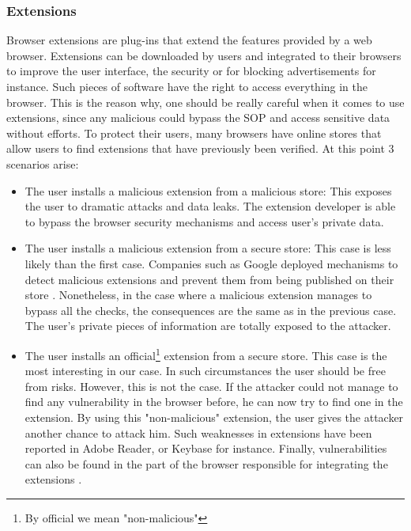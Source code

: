 \documentclass[journal]{IEEEtran}
\begin{document}
\subsubsection*{\textbf{Extensions}}
Browser extensions are plug-ins that extend the features provided by a web browser. Extensions can be downloaded by users and integrated to their browsers to improve the user interface, the security or for blocking advertisements for instance. Such pieces of software have the right to access everything in the browser. This is the reason why, one should be really careful when it comes to use extensions, since any malicious could bypass the SOP and access sensitive data without efforts. To protect their users, many browsers have online stores that allow users to find extensions that have previously been verified. At this point 3 scenarios arise:
\begin{itemize}
\item The user installs a malicious extension from a malicious store: This exposes the user to dramatic attacks and data leaks. The extension developer is able to bypass the browser security mechanisms and access user's private data.
\item The user installs a malicious extension from a secure store: This case is less likely than the first case. Companies such as Google deployed mechanisms to detect malicious extensions and prevent them from being published on their store \cite{extensionsGoogle}. Nonetheless, in the case where a malicious extension manages to bypass all the checks, the consequences are the same as in the previous case. The user's private pieces of information are totally exposed to the attacker.
\item The user installs an official\footnote{By official we mean "non-malicious"} extension from a secure store. This case is the most interesting in our case. In such circumstances the user should be free from risks. However, this is not the case. If the attacker could not manage to find any vulnerability in the browser before, he can now try to find one in the extension. By using this "non-malicious" extension, the user gives the attacker another chance to attack him. Such weaknesses in extensions have been reported in Adobe Reader\cite{adobeExtensionUXSS}, or Keybase \cite{uxssKeybase} for instance. Finally, vulnerabilities can also be found in the part of the browser responsible for integrating the extensions \cite{CVE-2015-7187} \cite{CVE-2017-5020}.

\end{itemize}
\end{document}
